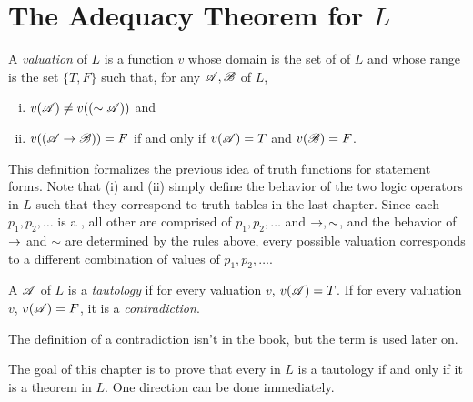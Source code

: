 \newcommand{\Lext}{\(L^{\ast}\)}
\newcommand{\mLext}{\L^{\ast}}
\newcommand{\Lextext}{\(L^{\ast\ast}\)}

\section{The Adequacy Theorem for \texorpdfstring{\(L\)}{L}}

\begin{definition}
  A \textit{valuation} of \(L\) is a function \(v\) whose domain is the set of \wfs{} of \(L\) and whose range is the set \(\{T, F\}\) such that, for any \wfs{} \(\mathscr{A}, \mathscr{B}\) of \(L\),

  \begin{enumerate}[(i)]
    \item \(v(\mathscr{A}) \neq v((\sim\mathscr{A}))\) and
    \item \(v((\mathscr{A} \rightarrow \mathscr{B})) = F\) if and only if \(v(\mathscr{A}) = T\) and \(v(\mathscr{B}) = F\).
  \end{enumerate}
\end{definition}

This definition formalizes the previous idea of truth functions for statement forms. Note that (i) and (ii) simply define the behavior of the two logic operators in \(L\) such that they correspond to truth tables in the last chapter. Since each \(p_1, p_2, \dots\) is a \wf{}, all other \wfs{} are comprised of \(p_1, p_2, \dots\) and \(\rightarrow, \sim\), and the behavior of \(\rightarrow\) and \(\sim\) are determined by the rules above, every possible valuation corresponds to a different combination of values of \(p_1, p_2, \dots\).

\begin{definition}
  A \wf{} \(\mathscr{A}\) of \(L\) is a \textit{tautology} if for every valuation \(v\), \(v(\mathscr{A}) = T\). If for every valuation \(v\), \(v(\mathscr{A}) = F\), it is a \textit{contradiction}.

  \note{} The definition of a contradiction isn't in the book, but the term is used later on.
\end{definition}

The goal of this chapter is to prove that every \wf{} in \(L\) is a tautology if and only if it is a theorem in \(L\). One direction can be done immediately.

